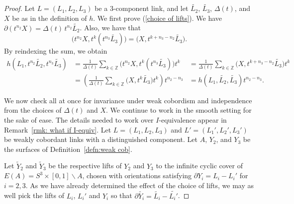 \documentclass[a4paper, 11pt]{amsart}
\newcommand{\blue}{\textcolor{blue}}
\newcommand{\JP}[1]{[JP] \blue{#1}}
\theoremstyle{definition}
\newcommand{\bdry}{\partial}
\newcommand{\pref}[1]{(\ref{#1})}
\newcommand{\noteta}{h}
\begin{document}

\begin{proof}
Let $L=(L_1,L_2,L_3)$ be a $3$-component link, and let $\widetilde{L_2}$, $\widetilde{L_3}$, $\Delta(t)$, and $X$ be as in the definition of $\noteta$. We first prove \pref{choice of lifts}.  We have $\bdry(t^{n_2}X)=\Delta(t)\,t^{n_2}\widetilde{L_2}$. Also, we have that
\[
\bigl(t^{n_2} X, t^k(t^{n_3}\widetilde{L_3})\bigr)
=
\bigl(X, t^{k+n_3-n_2}\widetilde{L_3}\bigr).
\]
By reindexing the sum, we obtain
\begin{equation*}\label{eqn: same noteta}
\begin{array}{rll}
h(L_1, t^{n_2}\widetilde{L_2},t^{n_3}\widetilde{L_3})&=\frac{1}{\Delta(t)}\sum_{k\in \mathbb{Z}} \bigl(t^{n_2}X, t^k(t^{n_3}\widetilde{L_3})\bigr)t^k
&=
\frac{1}{\Delta(t)}\sum_{k\in \mathbb{Z}} \bigl(X, t^{k+n_3-n_2}\widetilde{L_3}\bigr)t^k \\
&=
\left(
\frac{1}{\Delta(t)}\sum_{k\in \mathbb{Z}} \bigl(X, t^k\widetilde{L_3}\bigr)t^k
\right)t^{n_2-n_3}
&=h(L_1,\widetilde{L_2}, \widetilde{L_3})t^{n_2-n_3}.
\end{array}
\end{equation*}



We now check all at once for invariance under weak cobordism and independence from the choices of $\Delta(t)$ and $X$. We continue to work in the smooth setting for the sake of ease. The details needed to work over $I$-equivalence appear in Remark~\ref{rmk: what if I-equiv}. Let $L=(L_1,L_2,L_3)$ and $L'=(L_1',L_2',L_3')$ be weakly cobordant links with a distinguished component. Let $A$, $Y_2$, and $Y_3$ be the surfaces of Definition~\ref{defn:weak cob}.

Let $\widetilde{Y}_2$ and $\widetilde{Y}_3$ be the respective lifts of $Y_2$ and $Y_3$ to the infinite cyclic cover of $E(A) = S^3 \times [0, 1] \smallsetminus A$, chosen with orientations satisfying $\bdry Y_i = L_i - L_i'$ for $i = 2, 3$. As we have already determined the effect of the choice of lifts, we may as well pick the lifts of $L_i$, $L_i'$ and $Y_i$ so that  $\bdry \widetilde{Y_i}=\widetilde{L_i}-\widetilde{L_i'}$.


\end{proof}
\end{document}
